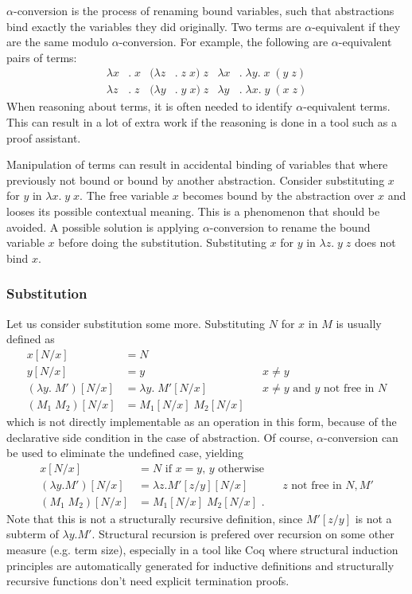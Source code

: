 \documentclass[a4paper,11pt]{article}
\begin{document}
$\alpha$-conversion is the process of renaming bound variables, such
that abstractions bind exactly the variables they did originally.
Two terms are $\alpha$-equivalent if they are the same modulo
$\alpha$-conversion.
For example, the following are $\alpha$-equivalent pairs of terms:
\begin{align*}
  \lambda x&. \; x & (\lambda z&. \; z \; x) \; z & \lambda x&. \; \lambda y. \; x \; (y \; z)\\
  \lambda z&. \; z & (\lambda y&. \; y \; x) \; z & \lambda y&. \; \lambda x. \; y \; (x \; z)
\end{align*}
When reasoning about terms, it is often needed to identify $\alpha$-equivalent
terms. This can result in a lot of extra work if the reasoning is done in a
tool such as a proof assistant.

Manipulation of terms can result in accidental binding of variables that
where previously not bound or bound by another abstraction.
Consider substituting $x$ for $y$ in $\lambda x. \; y \; x$.
The free variable $x$ becomes bound by the abstraction over $x$ and looses
its possible contextual meaning.
This is a phenomenon that should be avoided.
A possible solution is applying $\alpha$-conversion to rename the bound
variable $x$ before doing the substitution.
Substituting $x$ for $y$ in $\lambda z. \; y \; z$ does not bind $x$.

\subsubsection*{Substitution}

Let us consider substitution some more.
Substituting $N$ for $x$ in $M$ is usually defined as
\begin{align*}
  x[N/x]                 &= N\\
  y[N/x]                 &= y                      && \text{$x \neq y$} \\
  (\lambda y.\; M')[N/x] &= \lambda y. \; M'[N/x]  && \text{$x \neq y$ and $y$ not free in $N$} \\ %
  (M_1 \; M_2)[N/x]      &= M_1[N/x] \; M_2[N/x]
\end{align*}
which is not directly implementable as an operation in this form, because
of the declarative side condition in the case of abstraction.
Of course, $\alpha$-conversion can be used to eliminate the undefined
case, yielding
\begin{align*}
  x[N/x]              &= \text{$N$ if $x = y$, $y$ otherwise}\\
  (\lambda y.M')[N/x] &= \lambda z.M'[z/y][N/x]  && \text{$z$ not free in $N, M'$} \\ %
  (M_1 \; M_2)[N/x]   &= M_1[N/x] \; M_2[N/x] \text{ .}
\end{align*}
Note that this is not a structurally recursive definition, since
$M'[z/y]$ is not a subterm of $\lambda y.M'$.
Structural recursion is prefered over recursion on some other measure
(e.g. term size), especially in a tool like Coq where structural
induction principles are automatically generated for inductive
definitions and structurally recursive functions don't need explicit
termination proofs.
\end{document}
